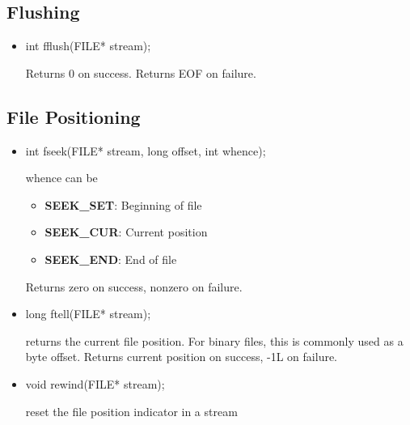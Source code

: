 \documentclass{report}
\begin{document}
    \pagebreak 
    \subsection{Flushing}
    \begin{itemize}
        \item
            \bigbreak \noindent 
            \begin{cppcode}
                int fflush(FILE* stream);
            \end{cppcode}
            \bigbreak \noindent 
            Returns 0 on success. Returns EOF on failure.
    \end{itemize}

    \pagebreak 
    \subsection{File Positioning}
    \begin{itemize}
        \item 
            \bigbreak \noindent 
            \begin{cppcode}
                int fseek(FILE* stream, long offset, int whence);
            \end{cppcode}
            \bigbreak \noindent 
            whence can be 
            \begin{itemize}
                \item \textbf{SEEK\_SET}: Beginning of file
                \item \textbf{SEEK\_CUR}: Current position
                \item \textbf{SEEK\_END}: End of file
            \end{itemize}
            Returns zero on success, nonzero on failure.
        \item 
            \bigbreak \noindent 
            \begin{cppcode}
                long ftell(FILE* stream);
            \end{cppcode}
            \bigbreak \noindent 
            returns the current file position. For binary files, this is commonly used as a byte offset.
            \bigbreak \noindent 
            Returns current position on success, -1L on failure.
        \item 
            \bigbreak \noindent 
            \begin{cppcode}
            void rewind(FILE* stream);
            \end{cppcode}
            \bigbreak \noindent 
            reset the file position indicator in a stream
    \end{itemize}
\end{document}
